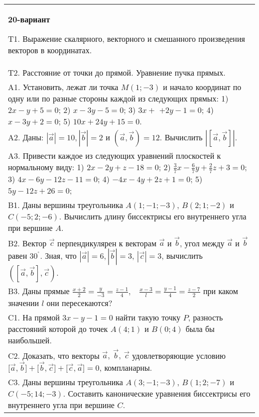 \documentclass{article}
\begin{document}
\begin{tabular}{m{17cm}}
\textbf{20-вариант}
\newline

T1. 
Выражение скалярного, векторного и смешанного произведения векторов в координатах.
 \\
T2. 
Расстояние от точки до прямой. Уравнение пучка прямых.
 \\
A1. 
Установить, лежат ли точка \(M(1; - 3)\) и начало координат по одну или по разные стороны каждой из следующих прямых: 1) \(2x - y + 5 = 0\); 2) \(x - 3y - 5 = 0\); 3) \(3x +\) \(+ 2y - 1 = 0\); 4) \(x - 3y + 2 = 0\); 5) \(10x + 24y + 15 = 0\).
 \\
A2. 
Даны: \(|\overrightarrow{a}| = 10,|\overrightarrow{b}| = 2\) и \(\left( \overrightarrow{a},\overrightarrow{b} \right) = 12\). Вычислить \(\left| \left\lbrack \overrightarrow{a},\overrightarrow{b} \right\rbrack \right|\).
 \\
A3. 
Привести каждое из следующих уравнений плоскостей к нормальному виду: 1) \(2x - 2y + z - 18 = 0\); 2) \(\frac{3}{7}x - \frac{6}{7}y + \frac{2}{7}z + 3 = 0\); 3) \(4x - 6y - 12z - 11 = 0\); 4) \(- 4x - 4y + 2z + 1 = 0\); 5) \(5y - 12z + 26 = 0\);
 \\
B1. 
Даны вершины треугольника \(A(1; - 1; - 3)\), \(B(2;1; - 2)\) и \(C( - 5;2; - 6)\). Вычислить длину биссектрисы его внутреннего угла при вершине \(A\). \\
B2. 
Вектор \(\overrightarrow{c}\) перпендикулярен к векторам \(\overrightarrow{a}\) и \(\overrightarrow{b}\), угол между \(\overrightarrow{a}\) и \(\overrightarrow{b}\) равен \(30^{{^\circ}}\). Зная, что \(|\overrightarrow{a}| = 6,|\overrightarrow{b}| = 3\), \(|\overrightarrow{c}| = 3\), вычислить \(\left( \left\lbrack \overrightarrow{a},\overrightarrow{b} \right\rbrack,\overrightarrow{c} \right)\).
 \\
B3. 
Даны прямые \(\frac{x + 2}{2} = \frac{y}{- 3} = \frac{z - 1}{4},\ \ \ \ \frac{x - 3}{l} = \frac{y - 1}{4} = \frac{z - 7}{2}\) при каком значении \(l\) они пересекаются?
 \\
C1. 
На прямой \(3x - y - 1 = 0\) найти такую точку \(P\), разность расстояний которой до точек \(A(4;1)\) и \(B(0;4)\) была бы наибольшей.
 \\
C2. 
Доказать, что векторы \(\overrightarrow{a},\ \overrightarrow{b},\ \overrightarrow{c}\) удовлетворяющие условию \(\lbrack\overrightarrow{a},\overrightarrow{b}\rbrack + \lbrack\overrightarrow{b},\overrightarrow{c}\rbrack + \lbrack\overrightarrow{c},\overrightarrow{a}\rbrack = 0\), компланарны.
 \\
C3. 
Даны вершины треугольника \(A(3; - 1; - 3)\), \(B(1;2; - 7)\) и \(C( - 5;14; - 3)\). Составить канонические уравнения биссектрисы его внутреннего угла при вершине \(C\).
 \\

\end{tabular}
\vspace{1cm}
\end{document}
